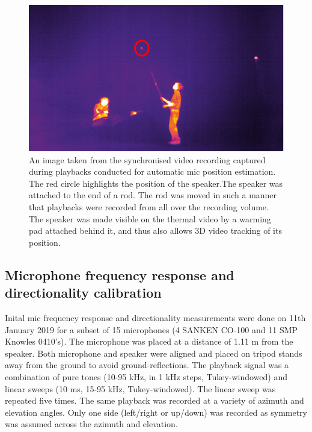 \documentclass[
]{book}
\begin{document}
\begin{figure}
\includegraphics[width=8.04in]{original_papers/ushichka-figures/speaker_w_heatpad} \caption{\label{fig:sfsplayback} An image taken from the synchronised video recording captured during playbacks conducted for automatic mic position estimation. The red circle highlights the position of the speaker.The speaker was attached to the end of a rod. The rod was moved in such a manner that playbacks were recorded from all over the recording volume. The speaker was made visible on the thermal video by a warming pad attached behind it, and thus also allows 3D video tracking of its position.}\label{fig:sfsplayback}
\end{figure}

\hypertarget{microphone-frequency-response-and-directionality-calibration}{%
\subsection{Microphone frequency response and directionality calibration}\label{microphone-frequency-response-and-directionality-calibration}}

Inital mic frequency response and directionality measurements were done on 11th January 2019 for a subset of 15 microphones (4 SANKEN CO-100 and 11 SMP Knowles 0410's). The microphone was placed at a distance of 1.11 m from the speaker. Both microphone and speaker were aligned and placed on tripod stands away from the ground to avoid ground-reflections. The playback signal was a combination of pure tones (10-95 kHz, in 1 kHz steps, Tukey-windowed) and linear sweeps (10 ms, 15-95 kHz, Tukey-windowed). The linear sweep was repeated five times. The same playback was recorded at a variety of azimuth and elevation angles. Only one side (left/right or up/down) was recorded as symmetry was assumed across the azimuth and elevation.
\end{document}
